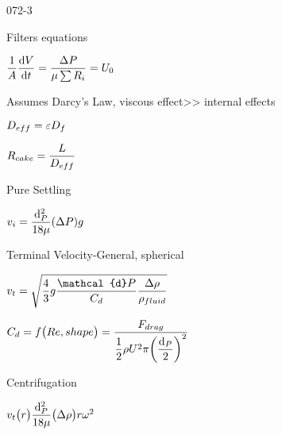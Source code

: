 \begin{mitframe}{072-3}
\begin{listone}
	\item Filters equations
    	\begin{listtwo}
        	\item $\dfrac{1}{\helmholtz}\dfrac{\mathrm{d}\vol}{\mathrm{d}t}=\dfrac{\iipf\p}{\chempot\sum\nolimits\gasconst_{\state}}=\uvel_0$
            	\begin{listthree}
                	\item Assumes Darcy's Law, viscous effect>> internal effects
                    \item $\elecdisplace_{eff}=\varepsilon\elecdisplace_{\fug}$
                    \begin{listfour}
                    	\item $\gasconst_{cake}=\dfrac{\length}{\elecdisplace_{eff}}$
                    \end{listfour}
                \end{listthree}
        \end{listtwo}
\item Pure Settling
		\begin{listtwo}
        	\item $\vvel_{\state}=\dfrac{\mathrm{d}_{\p}^2}{18\chempot}(\iipf\p)\grav$
            \item Terminal Velocity-General, spherical
            \begin{listfour}
            	\item $\vvel_t=\sqrt{\dfrac{4}{3}\grav\dfrac{\mathcal{d}\p}{\conc_{d}}\dfrac{\iipf\dens}{\dens_{fluid}}}$
                	\begin{listfour}
                    	\item $\conc_{d}=\fug\big(\reynolds, shape\big)=\dfrac{\force_{drag}}{\dfrac{1}{2}\dens\uvel^2\pi\bigg(\dfrac{\mathrm{d}_{\p}}{2}\bigg)^2}$         
                    \end{listfour}
            \end{listfour}
        \end{listtwo}
\item Centrifugation
	\begin{listtwo}
    \item $\vvel_{t}\big(\pos\big)\dfrac{\mathrm{d}^{2}_{\p}}{18\chempot}\big(\iipf\dens\big)\pos\omega^{2}$
    \end{listtwo}
\end{listone}        
\end{mitframe}